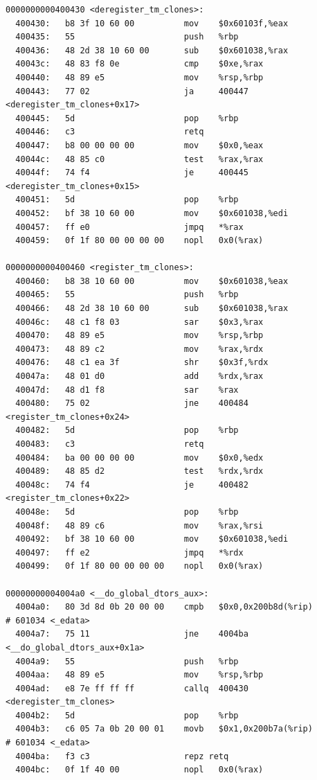 \documentclass[11pt]{article}
\begin{document}
\begin{enumerate}
\begin{verbatim}
0000000000400430 <deregister_tm_clones>:
  400430:	b8 3f 10 60 00       	mov    $0x60103f,%eax
  400435:	55                   	push   %rbp
  400436:	48 2d 38 10 60 00    	sub    $0x601038,%rax
  40043c:	48 83 f8 0e          	cmp    $0xe,%rax
  400440:	48 89 e5             	mov    %rsp,%rbp
  400443:	77 02                	ja     400447 <deregister_tm_clones+0x17>
  400445:	5d                   	pop    %rbp
  400446:	c3                   	retq   
  400447:	b8 00 00 00 00       	mov    $0x0,%eax
  40044c:	48 85 c0             	test   %rax,%rax
  40044f:	74 f4                	je     400445 <deregister_tm_clones+0x15>
  400451:	5d                   	pop    %rbp
  400452:	bf 38 10 60 00       	mov    $0x601038,%edi
  400457:	ff e0                	jmpq   *%rax
  400459:	0f 1f 80 00 00 00 00 	nopl   0x0(%rax)

0000000000400460 <register_tm_clones>:
  400460:	b8 38 10 60 00       	mov    $0x601038,%eax
  400465:	55                   	push   %rbp
  400466:	48 2d 38 10 60 00    	sub    $0x601038,%rax
  40046c:	48 c1 f8 03          	sar    $0x3,%rax
  400470:	48 89 e5             	mov    %rsp,%rbp
  400473:	48 89 c2             	mov    %rax,%rdx
  400476:	48 c1 ea 3f          	shr    $0x3f,%rdx
  40047a:	48 01 d0             	add    %rdx,%rax
  40047d:	48 d1 f8             	sar    %rax
  400480:	75 02                	jne    400484 <register_tm_clones+0x24>
  400482:	5d                   	pop    %rbp
  400483:	c3                   	retq   
  400484:	ba 00 00 00 00       	mov    $0x0,%edx
  400489:	48 85 d2             	test   %rdx,%rdx
  40048c:	74 f4                	je     400482 <register_tm_clones+0x22>
  40048e:	5d                   	pop    %rbp
  40048f:	48 89 c6             	mov    %rax,%rsi
  400492:	bf 38 10 60 00       	mov    $0x601038,%edi
  400497:	ff e2                	jmpq   *%rdx
  400499:	0f 1f 80 00 00 00 00 	nopl   0x0(%rax)

00000000004004a0 <__do_global_dtors_aux>:
  4004a0:	80 3d 8d 0b 20 00 00 	cmpb   $0x0,0x200b8d(%rip)        # 601034 <_edata>
  4004a7:	75 11                	jne    4004ba <__do_global_dtors_aux+0x1a>
  4004a9:	55                   	push   %rbp
  4004aa:	48 89 e5             	mov    %rsp,%rbp
  4004ad:	e8 7e ff ff ff       	callq  400430 <deregister_tm_clones>
  4004b2:	5d                   	pop    %rbp
  4004b3:	c6 05 7a 0b 20 00 01 	movb   $0x1,0x200b7a(%rip)        # 601034 <_edata>
  4004ba:	f3 c3                	repz retq 
  4004bc:	0f 1f 40 00          	nopl   0x0(%rax)


\end{verbatim}
\end{enumerate}
\end{document}
